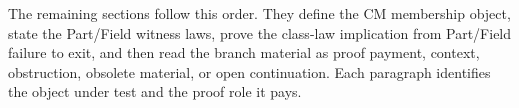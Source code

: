 The remaining sections follow this order.  They define the CM membership object, state the Part/Field witness laws, prove the class-law implication from Part/Field failure to exit, and then read the branch material as proof payment, context, obstruction, obsolete material, or open continuation.  Each paragraph identifies the object under test and the proof role it pays.
